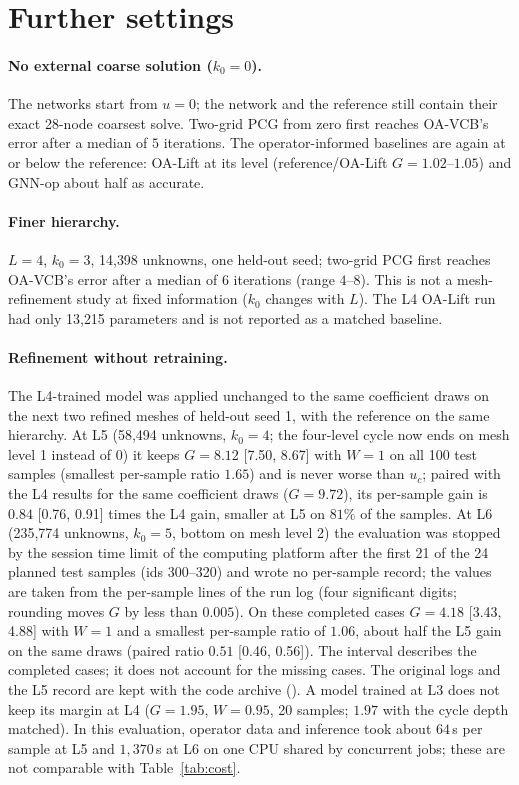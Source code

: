\section{Further settings}\label{app:settings}
\paragraph{No external coarse solution ($k_0 = 0$).} The networks start from $u=0$; the network and the reference still contain
their exact 28-node coarsest solve. Two-grid PCG from zero first reaches OA-VCB's error after a median of $5$ iterations. The
operator-informed baselines are again at or below the reference: OA-Lift at its level (reference/OA-Lift $G = 1.02$--$1.05$) and
GNN-op about half as accurate.
\paragraph{Finer hierarchy.} $L=4$, $k_0=3$, 14{,}398 unknowns, one held-out seed; two-grid PCG first reaches OA-VCB's error after a
median of $6$ iterations (range $4$--$8$). This is not a mesh-refinement study at fixed information ($k_0$ changes with $L$). The
L4 OA-Lift run had only 13{,}215 parameters and is not reported as a matched baseline.
\paragraph{Refinement without retraining.} The L4-trained model was applied unchanged to the same coefficient draws on the next
two refined meshes of held-out seed 1, with the reference on the same hierarchy. At L5 (58{,}494 unknowns, $k_0 = 4$; the
four-level cycle now ends on mesh level 1 instead of 0) it keeps $G = 8.12$ [7.50, 8.67] with $W = 1$ on all 100 test samples
(smallest per-sample ratio $1.65$) and is never worse than $u_c$; paired with the L4 results for the same coefficient draws
($G = 9.72$), its per-sample gain is $0.84$ [0.76, 0.91] times the L4 gain, smaller at L5 on $81\%$ of the samples. At L6
(235{,}774 unknowns, $k_0 = 5$, bottom on mesh level 2) the evaluation was stopped by the session time limit of the computing
platform after the first 21 of the 24 planned test samples (ids 300--320) and wrote no per-sample record; the values are taken from
the per-sample lines of the run log (four significant digits; rounding moves $G$ by less than $0.005$). On these completed cases
$G = 4.18$ [3.43, 4.88] with $W = 1$ and a smallest per-sample ratio of $1.06$, about half the L5 gain on the same draws (paired
ratio $0.51$ [0.46, 0.56]). The interval describes the completed cases; it does not account for the missing cases. The original
logs and the L5 record are kept with the code archive (). A model trained at L3 does not keep its margin
at L4 ($G = 1.95$, $W = 0.95$, 20 samples; $1.97$ with the cycle depth matched). In this evaluation, operator data and inference took
about $64$\,s per sample at L5 and $1{,}370$\,s at L6 on one CPU shared by concurrent jobs; these are not comparable with
Table~\ref{tab:cost}.
